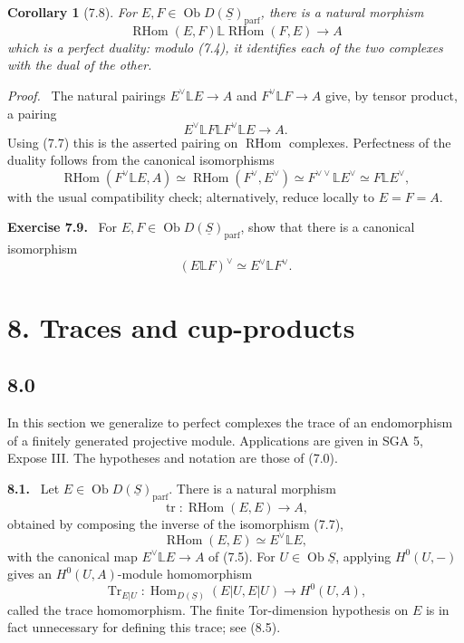 \documentclass[11pt]{article}
\theoremstyle{plain}
\newtheorem*{corollary*}{Corollary}
\theoremstyle{definition}
\theoremstyle{remark}
\newenvironment{statement}[1]{\par\medskip\noindent\textbf{#1.}\ }{\par\medskip}
\newenvironment{prooftext}{\par\noindent\textit{Proof.}\ }{\par\medskip}
\DeclareMathOperator{\Hom}{Hom}
\DeclareMathOperator{\ob}{Ob}
\DeclareMathOperator{\Tr}{Tr}
\DeclareMathOperator{\RHom}{RHom}
\providecommand{\tr}{\operatorname{tr}}
\providecommand{\uS}{\underline{S}}
\providecommand{\bbL}{\mathbb{L}}
\begin{document}
\begin{corollary*}[7.8]
For $E,F\in\ob D(\uS)_{\mathrm{parf}}$, there is a natural morphism
\[
\RHom(E,F)\bbL\RHom(F,E)\longrightarrow A
\]
which is a perfect duality: modulo (7.4), it identifies each of the two complexes with the dual of the other.
\end{corollary*}

\begin{prooftext}
The natural pairings $E^\vee\bbL E\to A$ and $F^\vee\bbL F\to A$ give, by tensor product, a pairing
\[
E^\vee\bbL F\bbL F^\vee\bbL E\longrightarrow A.
\]
Using (7.7) this is the asserted pairing on $\RHom$ complexes. Perfectness of the duality follows from the canonical isomorphisms
\[
\RHom(F^\vee\bbL E,A)
\simeq\RHom(F^\vee,E^\vee)
\simeq F^{\vee\vee}\bbL E^\vee
\simeq F\bbL E^\vee,
\]
with the usual compatibility check; alternatively, reduce locally to $E=F=A$.
\end{prooftext}

\begin{statement}{Exercise 7.9}
For $E,F\in\ob D(\uS)_{\mathrm{parf}}$, show that there is a canonical isomorphism
\[
(E\bbL F)^\vee\simeq E^\vee\bbL F^\vee.
\]
\end{statement}

\section*{8. Traces and cup-products}

\subsection*{8.0}
In this section we generalize to perfect complexes the trace of an endomorphism of a finitely generated projective module. Applications are given in SGA 5, Expose III. The hypotheses and notation are those of (7.0).

\begin{statement}{8.1}
Let $E\in\ob D(\uS)_{\mathrm{parf}}$. There is a natural morphism
\[
\tr:\RHom(E,E)\longrightarrow A,
\]
obtained by composing the inverse of the isomorphism (7.7),
\[
\RHom(E,E)\simeq E^\vee\bbL E,
\]
with the canonical map $E^\vee\bbL E\to A$ of (7.5). For $U\in\ob\uS$, applying $H^0(U,-)$ gives an $H^0(U,A)$-module homomorphism
\[
\Tr_{E|U}:\Hom_{D(\uS)}(E|U,E|U)\longrightarrow H^0(U,A),
\]
called the trace homomorphism. The finite Tor-dimension hypothesis on $E$ is in fact unnecessary for defining this trace; see (8.5).
\end{statement}
\end{document}
